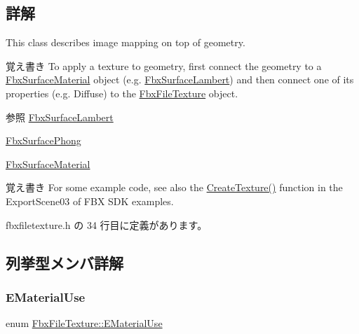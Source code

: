 \subsection{詳解}
This class describes image mapping on top of geometry. \begin{DoxyNote}{覚え書き}
To apply a texture to geometry, first connect the geometry to a \hyperlink{class_fbx_surface_material}{Fbx\+Surface\+Material} object (e.\+g. \hyperlink{class_fbx_surface_lambert}{Fbx\+Surface\+Lambert}) and then connect one of its properties (e.\+g. Diffuse) to the \hyperlink{class_fbx_file_texture}{Fbx\+File\+Texture} object. 
\end{DoxyNote}
\begin{DoxySeeAlso}{参照}
\hyperlink{class_fbx_surface_lambert}{Fbx\+Surface\+Lambert} 

\hyperlink{class_fbx_surface_phong}{Fbx\+Surface\+Phong} 

\hyperlink{class_fbx_surface_material}{Fbx\+Surface\+Material} 
\end{DoxySeeAlso}
\begin{DoxyNote}{覚え書き}
For some example code, see also the \hyperlink{_export_document_2main_8cxx_a412d99db8258714a76e40100f3aa2970}{Create\+Texture()} function in the Export\+Scene03 of F\+BX S\+DK examples. 
\end{DoxyNote}


 fbxfiletexture.\+h の 34 行目に定義があります。



\subsection{列挙型メンバ詳解}
\mbox{\label{class_fbx_file_texture_ae85eb429015d450d8cb8a753634c0d1e}} 
\subsubsection{\texorpdfstring{E\+Material\+Use}{EMaterialUse}}
{\footnotesize\ttfamily enum \hyperlink{class_fbx_file_texture_ae85eb429015d450d8cb8a753634c0d1e}{Fbx\+File\+Texture\+::\+E\+Material\+Use}}

